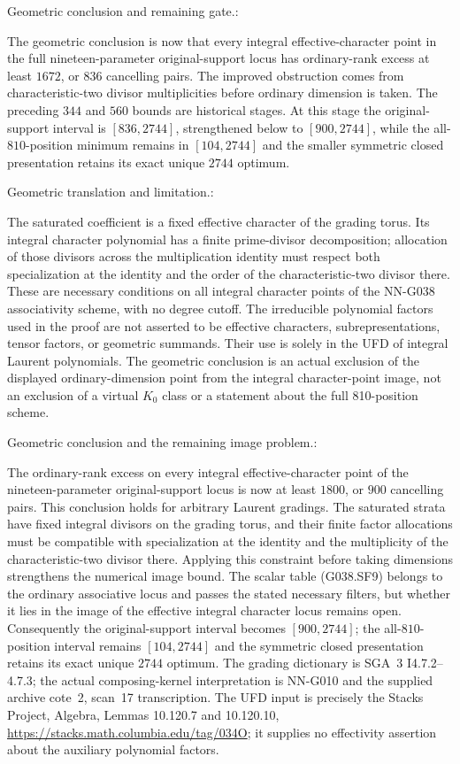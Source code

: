 \begin{geometricstatement}[NN-G038]
Geometric conclusion and remaining gate.:

The geometric conclusion is now that every integral
effective-character point in the full nineteen-parameter
original-support locus has ordinary-rank excess at least
$1672$, or $836$ cancelling pairs. The improved obstruction
comes from characteristic-two divisor multiplicities before
ordinary dimension is taken. The preceding $344$ and $560$
bounds are historical stages. At this stage the original-support interval is $[836,2744]$,
strengthened below to $[900,2744]$, while the all-$810$-position
minimum remains in $[104,2744]$ and the smaller symmetric
closed presentation retains its exact unique $2744$ optimum.


Geometric translation and limitation.:

The saturated coefficient is a fixed effective character of the
grading torus.  Its integral character polynomial has a finite
prime-divisor decomposition; allocation of those divisors across
the multiplication identity must respect both specialization at
the identity and the order of the characteristic-two divisor there.
These are necessary conditions on all integral character points
of the NN-G038 associativity scheme, with no degree cutoff.
The irreducible polynomial factors used in the proof are not
asserted to be effective characters, subrepresentations, tensor
factors, or geometric summands.  Their use is solely in the UFD
of integral Laurent polynomials.  The geometric conclusion is an
actual exclusion of the displayed ordinary-dimension point from
the integral character-point image, not an exclusion of a virtual
$K_0$ class or a statement about the full 810-position scheme.


Geometric conclusion and the remaining image problem.:

The ordinary-rank excess on every integral effective-character point
of the nineteen-parameter original-support locus is now at least
$1800$, or $900$ cancelling pairs.  This conclusion holds for arbitrary
Laurent gradings.  The saturated strata have fixed integral divisors
on the grading torus, and their finite factor allocations must be
compatible with specialization at the identity and the multiplicity
of the characteristic-two divisor there.  Applying this constraint
before taking dimensions strengthens the numerical image bound.
The scalar table (G038.SF9) belongs to the ordinary associative locus
and passes the stated necessary filters, but whether it lies in the
image of the effective integral character locus remains open.
Consequently the original-support interval becomes $[900,2744]$;
the all-$810$-position interval remains $[104,2744]$ and the symmetric
closed presentation retains its exact unique $2744$ optimum.
The grading dictionary is SGA~3 I4.7.2--4.7.3; the actual
composing-kernel interpretation is NN-G010 and the supplied archive
cote~2, scan~17 transcription.  The UFD input is precisely the Stacks
Project, Algebra, Lemmas 10.120.7 and 10.120.10,
\url{https://stacks.math.columbia.edu/tag/034O}; it supplies no
effectivity assertion about the auxiliary polynomial factors.


\end{geometricstatement}
